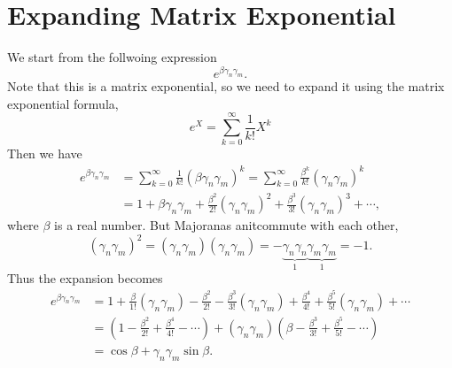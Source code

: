 \documentclass{article}
\begin{document}
\section{Expanding Matrix Exponential} %
\label{sec:Expanding Matrix Exponential}
We start from the follwoing expression
\[
	e^{\beta \gamma_n \gamma_m}.
\]
Note that this is a matrix exponential, so we need to expand it using the matrix exponential formula,
$$
	e^X=\sum_{k=0}^{\infty} \frac{1}{k !} X^k
$$
Then we have
\[
	\begin{aligned}
		e^{\beta \gamma_n \gamma_m} & = \sum_{k=0}^{\infty} \frac{1}{k !} (\beta \gamma_n \gamma_m)^k
		= \sum_{k=0}^{\infty} \frac{\beta^k}{k !} (\gamma_n \gamma_m)^k                                        \\
		                            & = 1 + \beta \gamma_n \gamma_m + \frac{\beta^2}{2!} (\gamma_n \gamma_m)^2
		+ \frac{\beta^3}{3!} (\gamma_n \gamma_m)^3 + \cdots,
	\end{aligned}
\]
where $ \beta $ is a real number. But Majoranas anitcommute with each other,
\[
	(\gamma_n \gamma_m)^2 = (\gamma_n \gamma_m)(\gamma_n \gamma_m)
	= - \underbrace{\gamma_n \gamma_n}_1 \underbrace{\gamma_m \gamma_m}_1 = -1.
\]
Thus the expansion becomes
\[
	\begin{aligned}
		e^{\beta \gamma_n \gamma_m} & = 1 + \frac{\beta}{1!} (\gamma_n \gamma_m) - \frac{\beta^2}{2!}
		- \frac{\beta^3}{3!} (\gamma_n \gamma_m) + \frac{\beta^4}{4!} + \frac{\beta^5}{5!} (\gamma_n \gamma_m) + \cdots \\
		                            & = \left( 1-\frac{\beta^2}{2 !}+\frac{\beta^4}{4 !}-\cdots \right)
		+ (\gamma_n \gamma_m) \left( \beta-\frac{\beta^3}{3 !}+\frac{\beta^5}{5 !}-\cdots \right)                       \\
		                            & = \cos{\beta} + \gamma_n \gamma_m \sin{\beta}.
	\end{aligned}
\]
\end{document}
